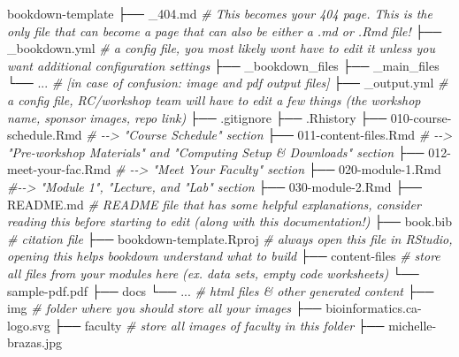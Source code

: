\documentclass[
]{book}
\newenvironment{Shaded}{\begin{snugshade}}{\end{snugshade}}
\newcommand{\CommentTok}[1]{\textcolor[rgb]{0.56,0.35,0.01}{\textit{#1}}}
\newcommand{\ExtensionTok}[1]{#1}
\newcommand{\NormalTok}[1]{#1}
\theoremstyle{definition}
\theoremstyle{definition}
\theoremstyle{definition}
\theoremstyle{definition}
\theoremstyle{remark}
\begin{document}
\begin{Shaded}
\begin{Highlighting}[]
\ExtensionTok{bookdown{-}template}
\ExtensionTok{├──}\NormalTok{ \_404.md }\CommentTok{\# This becomes your 404 page. This is the only file that can become a page that can also be either a .md or .Rmd file!}
\ExtensionTok{├──}\NormalTok{ \_bookdown.yml }\CommentTok{\# a config file, you most likely won\textquotesingle{}t have to edit it unless you want additional configuration settings}
\ExtensionTok{├──}\NormalTok{ \_bookdown\_files}
\ExtensionTok{├──}\NormalTok{ \_main\_files}
    \ExtensionTok{└──}\NormalTok{ ... }\CommentTok{\# [in case of confusion: image and pdf output files]}
\ExtensionTok{├──}\NormalTok{ \_output.yml }\CommentTok{\# a config file, RC/workshop team will have to edit a few things (the workshop name, sponsor images, repo link)}
\ExtensionTok{├──}\NormalTok{ .gitignore}
\ExtensionTok{├──}\NormalTok{ .Rhistory}
\ExtensionTok{├──}\NormalTok{ 010{-}course{-}schedule.Rmd }\CommentTok{\# {-}{-}\textgreater{} "Course Schedule" section}
\ExtensionTok{├──}\NormalTok{ 011{-}content{-}files.Rmd }\CommentTok{\# {-}{-}\textgreater{} "Pre{-}workshop Materials" and "Computing Setup \& Downloads" section}
\ExtensionTok{├──}\NormalTok{ 012{-}meet{-}your{-}fac.Rmd }\CommentTok{\# {-}{-}\textgreater{} "Meet Your Faculty" section}
\ExtensionTok{├──}\NormalTok{ 020{-}module{-}1.Rmd }\CommentTok{\#{-}{-}\textgreater{} "Module 1", "Lecture, and "Lab" section}
\ExtensionTok{├──}\NormalTok{ 030{-}module{-}2.Rmd}
\ExtensionTok{├──}\NormalTok{ README.md }\CommentTok{\# README file that has some helpful explanations, consider reading this before starting to edit (along with this documentation!)}
\ExtensionTok{├──}\NormalTok{ book.bib }\CommentTok{\# citation file}
\ExtensionTok{├──}\NormalTok{ bookdown{-}template.Rproj }\CommentTok{\# always open this file in RStudio, opening this helps bookdown understand what to build}
\ExtensionTok{├──}\NormalTok{ content{-}files }\CommentTok{\# store all files from your modules here (ex. data sets, empty code worksheets)}
    \ExtensionTok{└──}\NormalTok{ sample{-}pdf.pdf}
\ExtensionTok{├──}\NormalTok{ docs}
    \ExtensionTok{└──}\NormalTok{ ... }\CommentTok{\# html files \& other generated content}
\ExtensionTok{├──}\NormalTok{ img }\CommentTok{\# folder where you should store all your images}
    \ExtensionTok{├──}\NormalTok{ bioinformatics.ca{-}logo.svg }
    \ExtensionTok{├──}\NormalTok{ faculty }\CommentTok{\# store all images of faculty in this folder}
        \ExtensionTok{├──}\NormalTok{ michelle{-}brazas.jpg}

\end{Highlighting}
\end{Shaded}
\end{document}

